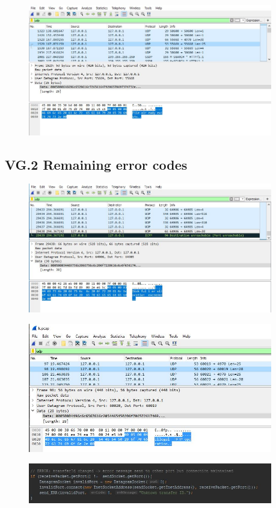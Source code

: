 \documentclass[a4paper,12pt]{article}
\numberwithin{figure}{section}
\begin{document}
\begin{figure}[h!]
	\centering
	\includegraphics[width=0.95\textwidth,keepaspectratio]{img/error6.jpg} 
	\caption{}
	\label{error 6}
\end{figure}

\newpage

\subsection{VG.2 Remaining error codes}

\begin{figure}[h!]
	\centering
	\includegraphics[width=0.95\textwidth,keepaspectratio]{img/error3.jpg} 
	\caption{}
	\label{error 3}
\end{figure}

\begin{figure}[h!]
	\centering
	\includegraphics[width=0.95\textwidth,keepaspectratio]{img/error4.jpg} 
	\caption{}
	\label{error 4}
\end{figure}

\begin{figure}[h!]
	\centering
	\includegraphics[width=0.95\textwidth,keepaspectratio]{img/error5.jpg} 
	\caption{}
	\label{error 5}
\end{figure}
\end{document}
